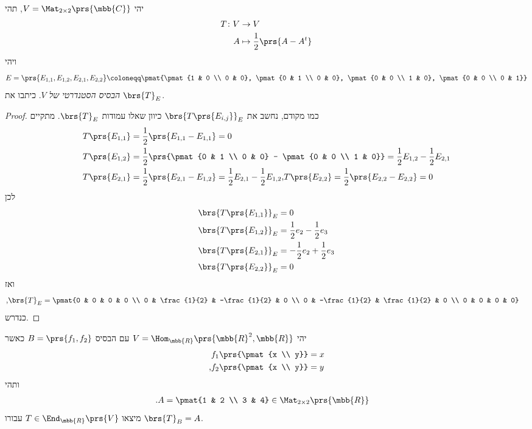 \documentclass[a4paper,10pt,twoside,openany]{book}
\begin{document}
\begin{exercise}
יהי
$V = \Mat_{2 \times 2}\prs{\mbb{C}}$,
תהי
\begin{align*}
T \colon V &\to V \\
A &\mapsto \frac{1}{2} \prs{A - A^t}
\end{align*}
ויהי
\[E = \prs{E_{1,1}, E_{1,2}, E_{2,1}, E_{2,2}} \coloneqq \pmat{\pmat{1 & 0 \\ 0 & 0}, \pmat{0 & 1 \\ 0 & 0}, \pmat{0 & 0 \\ 1 & 0}, \pmat{0 & 0 \\ 0 & 1}}\]
\emph{הבסיס הסטנדרטי של
$V$}.
כיתבו את
$\brs{T}_E$.
\end{exercise}

\begin{proof}
כמו מקודם, נחשב את
$\brs{T\prs{E_{i,j}}}_E$
כיוון שאלו עמודות
$\brs{T}_E$.
מתקיים
\begin{align*}
T\prs{E_{1,1}} &= \frac{1}{2} \prs{E_{1,1} - E_{1,1}} = 0 \\
T\prs{E_{1,2}} &= \frac{1}{2} \prs{\pmat{0 & 1 \\ 0 & 0} - \pmat{0 & 0 \\ 1 & 0}} = \frac{1}{2} E_{1,2} - \frac{1}{2} E_{2,1} \\
T\prs{E_{2,1}} &= \frac{1}{2} \prs{E_{2,1} - E_{1,2}} = \frac{1}{2} E_{2,1} - \frac{1}{2} E_{1,2}
\text{,} T\prs{E_{2,2}} = \frac{1}{2} \prs{E_{2,2} - E_{2,2}} = 0 \\
\end{align*}
לכן
\begin{align*}
\brs{T\prs{E_{1,1}}}_E &= 0 \\
\brs{T\prs{E_{1,2}}}_E &= \frac{1}{2} e_2 - \frac{1}{2} e_3 \\
\brs{T\prs{E_{2,1}}}_E &= -\frac{1}{2} e_2 + \frac{1}{2} e_3 \\
\brs{T\prs{E_{2,2}}}_E &= 0
\end{align*}
ואז
\begin{align*}
\text{,} \brs{T}_E &= \pmat{0 & 0 & 0 & 0 \\ 0 & \frac{1}{2} & -\frac{1}{2} & 0 \\ 0 & -\frac{1}{2} & \frac{1}{2} & 0 \\ 0 & 0 & 0 & 0}
\end{align*}
כנדרש.
\end{proof}

\begin{exercise}
יהי
$V = \Hom_{\mbb{R}}\prs{\mbb{R}^2, \mbb{R}}$
עם הבסיס
$B = \prs{f_1, f_2}$
כאשר
\begin{align*}
f_1\prs{\pmat{x \\ y}} &= x \\
\text{,} f_2\prs{\pmat{x \\ y}} &= y
\end{align*}
ותהי
\begin{align*}
\text{.} A &= \pmat{1 & 2 \\ 3 & 4} \in \Mat_{2 \times 2}\prs{\mbb{R}}
\end{align*}
מיצאו
$T \in \End_{\mbb{R}}\prs{V}$
עבורו
$\brs{T}_B = A$.
\end{exercise}
\end{document}
